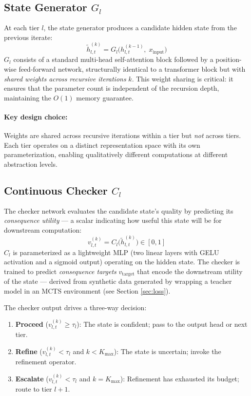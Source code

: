 \documentclass[11pt,a4paper]{article}
\theoremstyle{definition}
\begin{document}
\subsection{State Generator $G_l$}

At each tier $l$, the state generator produces a candidate hidden state from the previous iterate:
\[ \tilde{h}_{l,t}^{(k)} = G_l\bigl(h_{l,t}^{(k-1)},\; x_{\text{input}}\bigr) \]
$G_l$ consists of a standard multi-head self-attention block followed by a position-wise feed-forward network, structurally identical to a transformer block but with \textit{shared weights across recursive iterations} $k$. This weight sharing is critical: it ensures that the parameter count is independent of the recursion depth, maintaining the $O(1)$ memory guarantee.

\paragraph{Key design choice:} Weights are shared across recursive iterations within a tier but \textit{not} across tiers. Each tier operates on a distinct representation space with its own parameterization, enabling qualitatively different computations at different abstraction levels.

\subsection{Continuous Checker $C_l$}

The checker network evaluates the candidate state's quality by predicting its \textit{consequence utility} --- a scalar indicating how useful this state will be for downstream computation:
\[ v_{l,t}^{(k)} = C_l\bigl(\tilde{h}_{l,t}^{(k)}\bigr) \in [0, 1] \]
$C_l$ is parameterized as a lightweight MLP (two linear layers with GELU activation and a sigmoid output) operating on the hidden state. The checker is trained to predict \textit{consequence targets} $v_{\text{target}}$ that encode the downstream utility of the state --- derived from synthetic data generated by wrapping a teacher model in an MCTS environment (see Section \ref{sec:loss}).

The checker output drives a three-way decision:
\begin{enumerate}
    \item \textbf{Proceed} ($v_{l,t}^{(k)} \geq \tau_l$): The state is confident; pass to the output head or next tier.
    \item \textbf{Refine} ($v_{l,t}^{(k)} < \tau_l$ and $k < K_{\max}$): The state is uncertain; invoke the refinement operator.
    \item \textbf{Escalate} ($v_{l,t}^{(k)} < \tau_l$ and $k = K_{\max}$): Refinement has exhausted its budget; route to tier $l+1$.
\end{enumerate}
\end{document}
